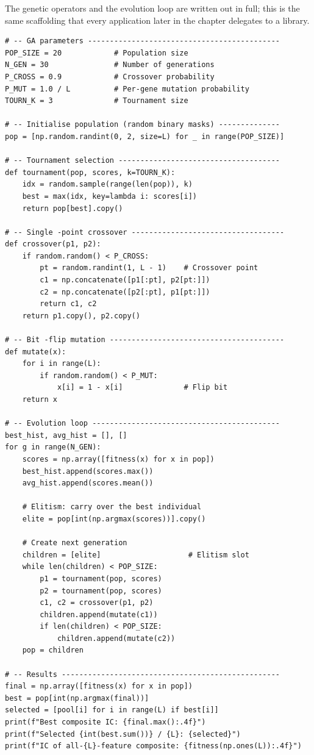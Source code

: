 The genetic operators and the evolution loop are written out in full; this is the same scaffolding that every application later in the chapter delegates to a library.

\begin{verbatim}
# -- GA parameters --------------------------------------------
POP_SIZE = 20            # Population size
N_GEN = 30               # Number of generations
P_CROSS = 0.9            # Crossover probability
P_MUT = 1.0 / L          # Per-gene mutation probability
TOURN_K = 3              # Tournament size

# -- Initialise population (random binary masks) --------------
pop = [np.random.randint(0, 2, size=L) for _ in range(POP_SIZE)]

# -- Tournament selection -------------------------------------
def tournament(pop, scores, k=TOURN_K):
    idx = random.sample(range(len(pop)), k)
    best = max(idx, key=lambda i: scores[i])
    return pop[best].copy()

# -- Single -point crossover -----------------------------------
def crossover(p1, p2):
    if random.random() < P_CROSS:
        pt = random.randint(1, L - 1)    # Crossover point
        c1 = np.concatenate([p1[:pt], p2[pt:]])
        c2 = np.concatenate([p2[:pt], p1[pt:]])
        return c1, c2
    return p1.copy(), p2.copy()

# -- Bit -flip mutation ----------------------------------------
def mutate(x):
    for i in range(L):
        if random.random() < P_MUT:
            x[i] = 1 - x[i]              # Flip bit
    return x

# -- Evolution loop -------------------------------------------
best_hist, avg_hist = [], []
for g in range(N_GEN):
    scores = np.array([fitness(x) for x in pop])
    best_hist.append(scores.max())
    avg_hist.append(scores.mean())

    # Elitism: carry over the best individual
    elite = pop[int(np.argmax(scores))].copy()

    # Create next generation
    children = [elite]                    # Elitism slot
    while len(children) < POP_SIZE:
        p1 = tournament(pop, scores)
        p2 = tournament(pop, scores)
        c1, c2 = crossover(p1, p2)
        children.append(mutate(c1))
        if len(children) < POP_SIZE:
            children.append(mutate(c2))
    pop = children

# -- Results --------------------------------------------------
final = np.array([fitness(x) for x in pop])
best = pop[int(np.argmax(final))]
selected = [pool[i] for i in range(L) if best[i]]
print(f"Best composite IC: {final.max():.4f}")
print(f"Selected {int(best.sum())} / {L}: {selected}")
print(f"IC of all-{L}-feature composite: {fitness(np.ones(L)):.4f}")
\end{verbatim}

